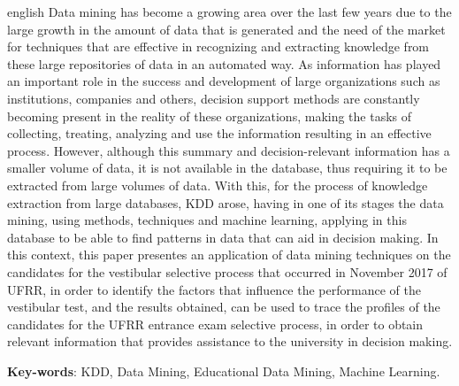 \documentclass[
	12pt,				%
    oneside,			%
	a4paper,			%
	chapter=TITLE,		%
	english,			%
	brazil				%
	]{abntex2}
\begin{document}
\begin{resumo}[Abstract]
 \begin{otherlanguage*}{english}
   Data mining has become a growing area over the last few years due to the large growth in the amount of data that is generated and the need of the market for techniques that are effective in recognizing and extracting knowledge from these large repositories of data in an automated way. As information has played an important role in the success and development of large organizations such as institutions, companies and others, decision support methods are constantly becoming present in the reality of these organizations, making the tasks of collecting, treating, analyzing and use the information resulting in an effective process. However, although this summary and decision-relevant information has a smaller volume of data, it is not available in the database, thus requiring it to be extracted from large volumes of data. With this, for the process of knowledge extraction from large databases, KDD arose, having in one of its stages the data mining, using methods, techniques and machine learning, applying in this database to be able to find patterns in data that can aid in decision making. In this context, this paper presentes an application of data mining techniques on the candidates for the vestibular selective process that occurred in November 2017 of UFRR, in order to identify the factors that influence the performance of the vestibular test, and the results obtained, can be used to trace the profiles of the candidates for the UFRR entrance exam selective process, in order to obtain relevant information that provides assistance to the university in decision making. 

   \vspace{\onelineskip}
 
   \noindent 
   \textbf{Key-words}: KDD, Data Mining, Educational Data Mining, Machine Learning.
 \end{otherlanguage*}
\end{resumo}
\listoffigures*
\cleardoublepage

\listoftables*
\cleardoublepage
\end{document}
